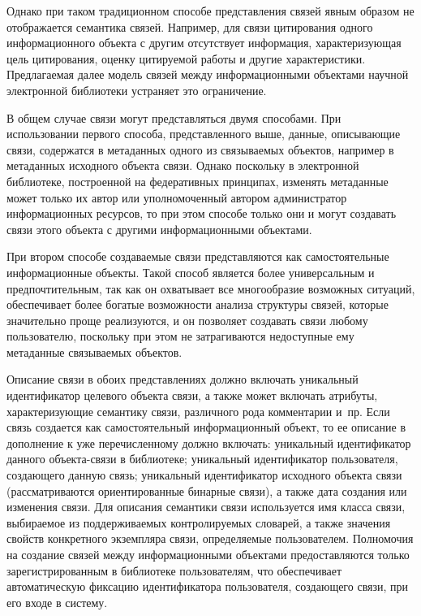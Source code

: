 \begin{multicols}{2}
{}
  
  Однако при таком традиционном способе представления связей явным 
образом не отображается семантика связей. Например, для связи цитирования 
одного информационного объекта с другим отсутствует информация, 
характеризующая цель цитирования, оценку цитируемой работы и другие 
характеристики. Предлагаемая далее модель связей между информационными 
объектами научной электронной библиотеки устраняет это ограничение.
  
  В общем случае связи могут представляться двумя способами. При 
использовании первого способа, представленного выше, данные, описывающие 
связи, содержатся в метаданных одного из связываемых объектов, например в 
метаданных исходного объекта связи. Однако поскольку в электронной 
библиотеке, построенной на федеративных принципах, изменять метаданные 
может только их автор или уполномоченный автором администратор 
информационных ресурсов, то при этом способе только они и могут создавать 
связи этого объекта с другими информационными объектами. 
  
  При втором способе создаваемые связи представляются как самостоятельные 
информационные объекты. Такой способ является более универсальным и 
предпочтительным, так как он охватывает все многообразие возможных 
ситуаций, обеспечивает более богатые возможности анализа структуры связей, 
которые значительно проще реализуются, и он позволяет создавать связи 
любому пользователю, поскольку при этом не затрагиваются недоступные ему 
метаданные связываемых объектов. 
  
  Описание связи в обоих представлениях должно включать уникальный 
идентификатор целевого объекта связи, а также может включать атрибуты, 
характеризующие семантику связи, различного рода комментарии и~пр. Если 
связь создается как самостоятельный информационный объект, то ее описание 
в дополнение к уже перечисленному должно включать: уникальный 
идентификатор данного объек\-та-свя\-зи в библиотеке; уникальный 
идентификатор пользователя, создающего данную %
связь; уникальный 
идентификатор исходного объек\-та связи (рассматриваются ориентированные 
бинарные связи), а также дата создания или изменения связи. Для описания 
семантики связи используется имя класса связи, выбираемое из 
поддерживаемых контролируемых словарей, а также значения свойств 
конкретного экземпляра связи, определяемые пользователем. Полномочия на 
создание связей между информационными объектами предоставляются только 
зарегистрированным в библиотеке пользователям, что обеспечивает 
автоматическую фиксацию идентификатора пользователя, создающего связи, 
при его входе в сис\-тему. 
{

}
\end{multicols}

